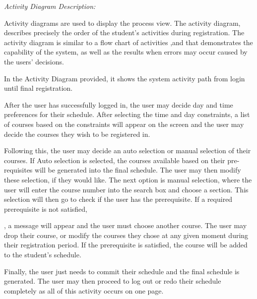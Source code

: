\emph{Activity Diagram Description:}

Activity diagrams are used to display the process view. The activity
diagram, describes precisely the order of the student's activities
during registration. The activity diagram is similar to a flow chart of
activities ,and that demonstrates the capability of the system, as well
as the results when errors may occur caused by the users' decisions.

In the Activity Diagram provided, it shows the system activity path from
login until final registration.

After the user has successfully logged in, the user may decide day and
time preferences for their schedule. After selecting the time and day
constraints, a list of courses based on the constraints will appear on
the screen and the user may decide the courses they wish to be
registered in.

Following this, the user may decide an auto selection or manual
selection of their courses. If Auto selection is selected, the courses
available based on their pre-requisites will be generated into the final
schedule. The user may then modify these selection, if they would like.
The next option is manual selection, where the user will enter the
course number into the search box and choose a section. This selection
will then go to check if the user has the prerequisite. If a required
prerequisite is not satisfied,

, a message will appear and the user must choose another course. The
user may drop their course, or modify the courses they chose at any
given moment during their registration period. If the prerequisite is
satisfied, the course will be added to the student's schedule.

Finally, the user just needs to commit their schedule and the final
schedule is generated. The user may then proceed to log out or redo
their schedule completely as all of this activity occurs on one page.

